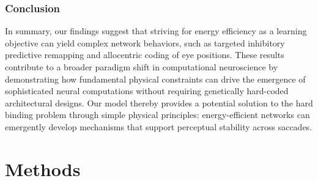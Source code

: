 \documentclass[10pt,letterpaper]{article}
\begin{document}
\subsubsection{Conclusion}
In summary, our findings suggest that striving for energy efficiency as a learning 
objective can yield complex network behaviors, such as targeted inhibitory 
predictive remapping and allocentric coding of eye positions. These results 
contribute to a broader paradigm shift in computational neuroscience by demonstrating 
how fundamental physical constraints can drive the emergence of sophisticated 
neural computations without requiring genetically hard-coded architectural designs. 
Our model thereby provides a potential solution to the hard binding problem through 
simple physical principles: energy-efficient networks can emergently develop mechanisms 
that support perceptual stability across saccades.

\section{Methods}
 

\end{document}
